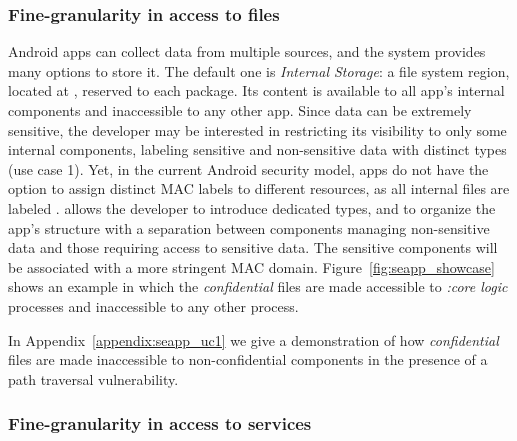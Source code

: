 \subsubsection{Fine-granularity in access to files}

Android apps can collect data from multiple sources, and the system
provides many options to store it.  The default one is {\em Internal
  Storage}: a file system region, located at \dataappdir, reserved to
each package.  Its content is available to all app's internal
components and inaccessible to any other app.  Since data can be
extremely sensitive, the developer may be interested in restricting
its visibility to only some internal components, labeling sensitive
and non-sensitive data with distinct \sel types (use case 1).  Yet, in
the current Android security model, apps do not have the option to
assign distinct MAC labels to different resources, as all internal
files are labeled \appdatafile.  \seapp allows the developer to
introduce dedicated types, and to organize the app's structure with a
separation between components managing non-sensitive data and those
requiring access to sensitive data.  The sensitive components will be
associated with a more stringent MAC domain.
Figure~\ref{fig:seapp_showcase} shows an example in which the {\em
  confidential} files are made accessible to {\em :core\textunderscore
  logic} processes and inaccessible to any other process.

In Appendix~\ref{appendix:seapp_uc1} we give a demonstration of how {\em
  confidential} files are made inaccessible to non-confidential
components in the presence of a path traversal vulnerability.


\subsubsection{Fine-granularity in access to services}

